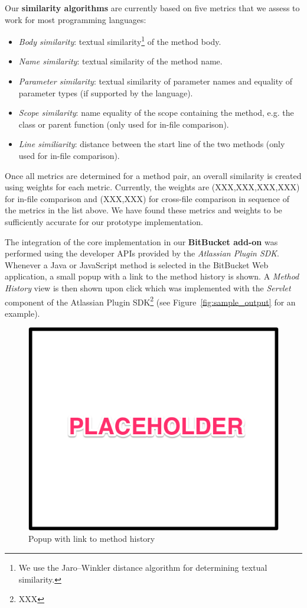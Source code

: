 Our \textbf{similarity algorithms} are currently based on five metrics that we assess to work for most programming languages:
\begin{itemize}
	\item \textit{Body similarity}: textual similarity\footnote{We use the Jaro–Winkler distance algorithm for determining textual similarity.} of the method body.
	\item \textit{Name similarity}: textual similarity of the method name.
	\item \textit{Parameter similarity}: textual similarity of parameter names and equality of parameter types (if supported by the language).
	\item \textit{Scope similarity}: name equality of the scope containing the method, e.g. the class or parent function (only used for in-file comparison).
	\item \textit{Line similiarity}: distance between the start line of the two methods (only used for in-file comparison).
\end{itemize}

Once all metrics are determined for a method pair, an overall similarity is created using weights for each metric. Currently, the weights are (XXX,XXX,XXX,XXX) for in-file comparison and (XXX,XXX) for cross-file comparison in sequence of the metrics in the list above. We have found these metrics and weights to be sufficiently accurate for our prototype implementation.

The integration of the core implementation in our \textbf{BitBucket add-on} was performed using the developer APIs provided by the \textit{Atlassian Plugin SDK}. Whenever a Java or JavaScript method is selected in the BitBucket Web application, a small popup with a link to the method history is shown. A \textit{Method History} view is then shown upon click which was implemented with the \textit{Servlet} component of the Atlassian Plugin SDK\footnote{XXX} (see Figure~\ref{fig:sample_output} for an example).

\begin{figure}[t!]
  \includegraphics[width=0.98\columnwidth]{figures/bitbucket_popup}
  \caption{Popup with link to method history}
  \label{fig:bitbucket_popup}
\end{figure}

